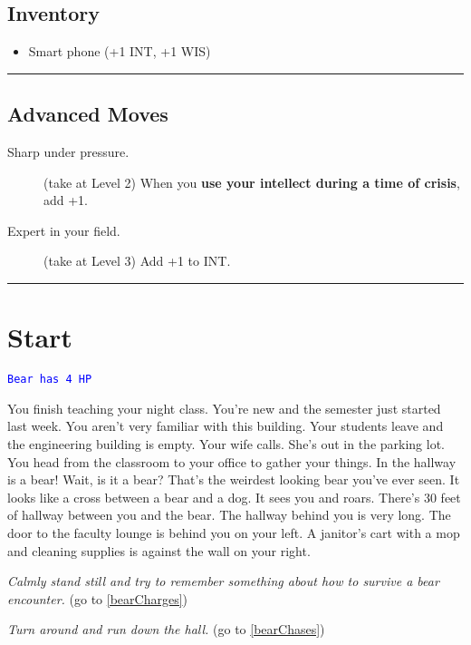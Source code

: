\documentclass[12pt]{article}
\begin{document}
\begin{multicols}{2}
\subsection*{Inventory}
\begin{itemize}
\item Smart phone (+1 INT, +1 WIS)
\end{itemize}

\end{multicols}

\hrule

\subsection*{Advanced Moves}

\begin{description}
\item[Sharp under pressure.] (take at Level 2) When you \textbf{use your intellect during a time of crisis}, add +1.
\item[Expert in your field.] (take at Level 3) Add +1 to INT.
\end{description}

\hrule

\pagebreak

\section{Start}

\textcolor{blue}{\texttt{Bear has 4 HP}}

You finish teaching your night class. You're new and the semester just started last week. You aren't very familiar with this building. Your students leave and the engineering building is empty. Your wife calls. She's out in the parking lot. You head from the classroom to your office to gather your things. In the hallway is a bear! Wait, is it a bear? That's the weirdest looking bear you've ever seen. It looks like a cross between a bear and a dog. It sees you and roars. There's 30 feet of hallway between you and the bear. The hallway behind you is very long. The door to the faculty lounge is behind you on your left. A janitor's cart with a mop and cleaning supplies is against the wall on your right.

\textit{Calmly stand still and try to remember something about how to survive a bear encounter.} (go to \ref{bearCharges})

\textit{Turn around and run down the hall.} (go to \ref{bearChases})
\end{document}
